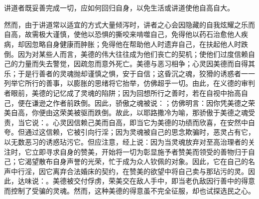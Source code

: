 

\section{}

讲道者既妥善完成一切，应如何回归自身，以免生活或讲道使他自高自大。\par

然而，由于讲道常以适宜的方式大量倾泻时，讲者之心会因隐藏的自我炫耀之乐而自高，故需极大谨慎，使他以恐惧的撕咬来啃噬自己，免得他以药石治愈他人疾病，却因忽略自身健康而肿胀；免得他在帮助他人时遗弃自己，在扶起他人时跌倒。因为对某些人而言，美德的伟大往往成为他们丧亡的契机；使他们过度信赖自己的力量而失去警觉，因疏忽而意外死亡。美德与恶习相争；心灵因美德而自得其乐；于是行善者的灵魂抛却谨慎之惧，安于自信；这昏沉之魂，狡猾的诱惑者一一列举它所行的善事，以膨胀的思绪将它抬举，仿佛超乎一切。由此，在义德的审判者眼前，美德的记忆成了灵魂的陷阱；因为回想所行之善时，若在自视中抬高自己，便在谦逊之作者前跌倒。因此，骄傲之魂被说：；仿佛明言：因你凭美德之荣美自高，你便由这荣美被驱而跌倒。故此，以耶路撒冷为喻，那骄傲于美德之魂受责，当它说：。心灵因信赖己美而自高，即当它为美德的功绩而欣喜，在安然中自夸。但通过这信赖，它被引向行淫；因为灵魂被自己的思念欺骗时，恶灵占有它，以无数恶习的诱惑玷污它。但应注意，经上说：因为当灵魂放弃对至高治理者的关注时，它立即寻求自身的赞美，开始将一切为彰显施予者赞美而领受的善物归于自己；它渴望散布自身声誉的光荣，忙于成为众人钦佩的对象。因此，它在自己的名声中行淫，因它离弃合法婚床的契约，在赞美的欲望中将自己卖与那玷污的灵。因此，达味说：。美德被交付俘虏，荣美交在敌人手中，即当老仇敌因行善中的得意而控制了受骗的灵魂。然而，这种美德的得意虽不完全征服，却也试探选民之心。\par

